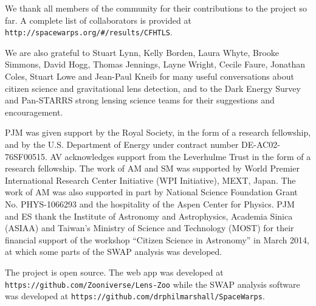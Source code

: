 We thank all \Ncollaboration members of the \sw community for their
contributions to the project so far. A complete list of collaborators is
provided at \texttt{http://spacewarps.org/\#/results/CFHTLS}.

We are also grateful to Stuart Lynn, Kelly Borden, Laura Whyte, Brooke Simmons,
David Hogg, Thomas Jennings, Layne  Wright, Cecile Faure, Jonathan Coles, Stuart
Lowe and Jean-Paul Kneib for many useful conversations about citizen science and
gravitational lens detection, and to the Dark Energy Survey and Pan-STARRS strong
lensing science teams for their suggestions and encouragement.

PJM was given support by the Royal Society, in the form of a research
fellowship, and by the U.S. Department of Energy under contract number DE-AC02-76SF00515.
%
AV acknowledges support from the Leverhulme Trust in the form of a research
fellowship.
%
The work of AM and SM was supported by World Premier International Research
Center Initiative (WPI Initiative), MEXT, Japan. The work of AM was also supported in
part by National Science Foundation Grant No. PHYS-1066293 and the hospitality
of the Aspen Center for Physics.
%
%
PJM and ES thank the Institute of Astronomy and Astrophysics, Academia Sinica
(ASIAA) and Taiwan's Ministry of Science and Technology (MOST) for their
financial support of the workshop ``Citizen Science in Astronomy'' in March
2014, at which some parts of the SWAP analysis was developed.

The \sw project is open source.
The web app was developed at \texttt{https://github.com/Zooniverse/Lens-Zoo}
while the SWAP analysis software was developed at
\texttt{https://github.com/drphilmarshall/SpaceWarps}.

